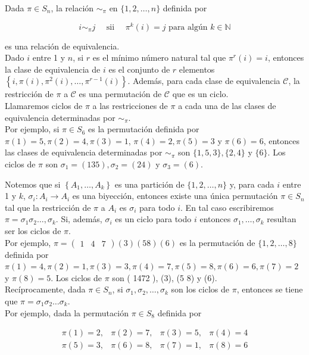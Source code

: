 \documentclass[10pt]{article}
\begin{document}
Dada $\pi \in S_{n}$, la relación $\sim_{\pi}$ en $\{1,2, \ldots, n\}$ definida por

$$
i \sim_{\pi} j \quad \text { sii } \quad \pi^{k}(i)=j \text { para algún } k \in \mathbb{N}
$$

es una relación de equivalencia.\\
Dado $i$ entre 1 y $n$, si $r$ es el mínimo número natural tal que $\pi^{r}(i)=i$, entonces la clase de equivalencia de $i$ es el conjunto de $r$ elementos $\left\{i, \pi(i), \pi^{2}(i), \ldots, \pi^{r-1}(i)\right\}$. Además, para cada clase de equivalencia $\mathcal{C}$, la restricción de $\pi$ a $\mathcal{C}$ es una permutación de $\mathcal{C}$ que es un ciclo.\\
Llamaremos ciclos de $\pi$ a las restricciones de $\pi$ a cada una de las clases de equivalencia determinadas por $\sim_{\pi}$.\\
Por ejemplo, si $\pi \in S_{6}$ es la permutación definida por $\pi(1)=5, \pi(2)=4, \pi(3)=1$, $\pi(4)=2, \pi(5)=3$ y $\pi(6)=6$, entonces las clases de equivalencia determinadas por $\sim_{\pi}$ son $\{1,5,3\},\{2,4\}$ y $\{6\}$. Los ciclos de $\pi$ son $\sigma_{1}=(135), \sigma_{2}=(24)$ y $\sigma_{3}=(6)$.

Notemos que si $\left\{A_{1}, \ldots, A_{k}\right\}$ es una partición de $\{1,2, \ldots, n\}$ y, para cada $i$ entre 1 y $k$, $\sigma_{i}: A_{i} \longrightarrow A_{i}$ es una biyección, entonces existe una única permutación $\pi \in S_{n}$ tal que la restricción de $\pi$ a $A_{i}$ es $\sigma_{i}$ para todo $i$. En tal caso escribiremos $\pi=\sigma_{1} \sigma_{2} \ldots, \sigma_{k}$. Si, además, $\sigma_{i}$ es un ciclo para todo $i$ entonces $\sigma_{1}, \ldots, \sigma_{k}$ resultan ser los ciclos de $\pi$.\\
Por ejemplo, $\pi=\left(\begin{array}{lll}1 & 4 & 7\end{array}\right)(3)(58)(6)$ es la permutación de $\{1,2, \ldots, 8\}$ definida por $\pi(1)=4, \pi(2)=1, \pi(3)=3, \pi(4)=7, \pi(5)=8, \pi(6)=6, \pi(7)=2$ y $\pi(8)=5$. Los ciclos de $\pi$ son ( 1472 ), (3), (5 8) y (6).\\
Recíprocamente, dada $\pi \in S_{n}$, si $\sigma_{1}, \sigma_{2}, \ldots, \sigma_{k}$ son los ciclos de $\pi$, entonces se tiene que $\pi=\sigma_{1} \sigma_{2} \ldots \sigma_{k}$.\\
Por ejemplo, dada la permutación $\pi \in S_{8}$ definida por

$$
\begin{array}{llll}
\pi(1)=2, & \pi(2)=7, & \pi(3)=5, & \pi(4)=4 \\
\pi(5)=3, & \pi(6)=8, & \pi(7)=1, & \pi(8)=6
\end{array}
$$
\end{document}
